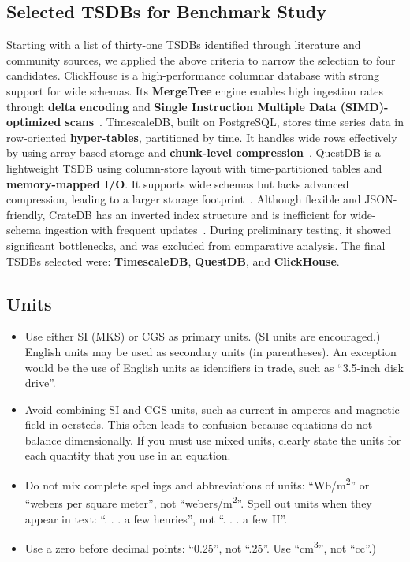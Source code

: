 \documentclass[conference]{IEEEtran}
\begin{document}
\subsection{Selected TSDBs for Benchmark Study}
Starting with a list of thirty-one TSDBs identified through literature and community sources, we applied the above criteria to narrow the selection to four candidates.
ClickHouse is a high-performance columnar database with strong support for wide schemas. Its \textbf{MergeTree} engine enables high ingestion rates through \textbf{delta encoding} and \textbf{Single Instruction Multiple Data (SIMD)-optimized scans}~\cite{6_clickbench}.
TimescaleDB, built on PostgreSQL, stores time series data in row-oriented \textbf{hyper-tables}, partitioned by time. It handles wide rows effectively by using array-based storage and \textbf{chunk-level compression}~\cite{2_tsmsurvey2017}.
 QuestDB is a lightweight TSDB using column-store layout with time-partitioned tables and \textbf{memory-mapped I/O}. It supports wide schemas but lacks advanced compression, leading to a larger storage footprint~\cite{13_questdbdocs}.
Although flexible and JSON-friendly, CrateDB has an inverted index structure and is inefficient for wide-schema ingestion with frequent updates~\cite{15_rinaldi2019}. During preliminary testing, it showed significant bottlenecks, and was excluded from comparative analysis.
The final TSDBs selected were: \textbf{TimescaleDB}, \textbf{QuestDB}, and \textbf{ClickHouse}.


\subsection{Units}
\begin{itemize}
\item Use either SI (MKS) or CGS as primary units. (SI units are encouraged.) English units may be used as secondary units (in parentheses). An exception would be the use of English units as identifiers in trade, such as ``3.5-inch disk drive''.
\item Avoid combining SI and CGS units, such as current in amperes and magnetic field in oersteds. This often leads to confusion because equations do not balance dimensionally. If you must use mixed units, clearly state the units for each quantity that you use in an equation.
\item Do not mix complete spellings and abbreviations of units: ``Wb/m\textsuperscript{2}'' or ``webers per square meter'', not ``webers/m\textsuperscript{2}''. Spell out units when they appear in text: ``. . . a few henries'', not ``. . . a few H''.
\item Use a zero before decimal points: ``0.25'', not ``.25''. Use ``cm\textsuperscript{3}'', not ``cc''.)
\end{itemize}
\end{document}
